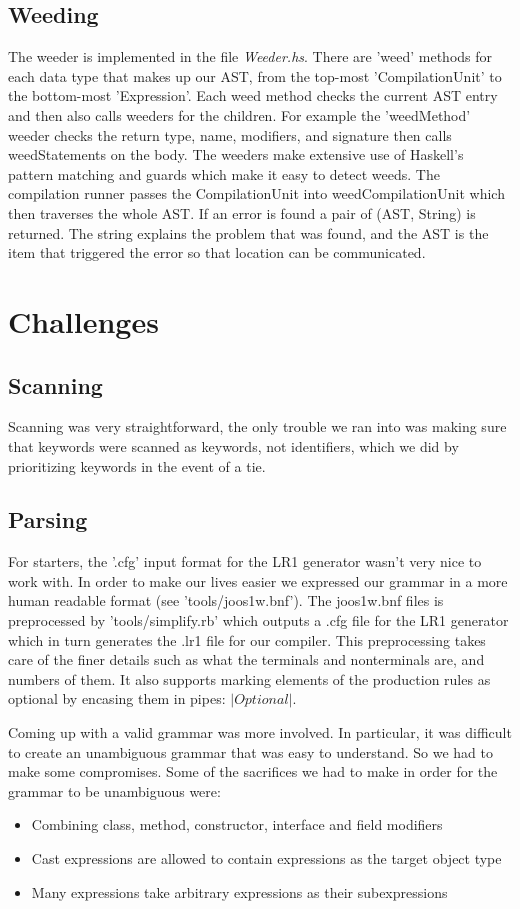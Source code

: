 \documentclass[12pt,letterpaper]{article}
\begin{document}
\subsection{Weeding}
The weeder is implemented in the file \emph{Weeder.hs}.
There are 'weed' methods for each data type that makes up our AST, from the top-most 'CompilationUnit' to the bottom-most 'Expression'.
Each weed method checks the current AST entry and then also calls weeders for the children.
For example the 'weedMethod' weeder checks the return type, name, modifiers, and signature then calls weedStatements on the body.
The weeders make extensive use of Haskell's pattern matching and guards which make it easy to detect weeds.
The compilation runner passes the CompilationUnit into weedCompilationUnit which then traverses the whole AST.
If an error is found a pair of (AST, String) is returned.
The string explains the problem that was found, and the AST is the item that triggered the error so that location can be communicated.

\section{Challenges}
\subsection{Scanning}
Scanning was very straightforward, the only trouble we ran into was making sure that keywords were scanned as keywords, not identifiers, which we did by prioritizing keywords in the event of a tie.

\subsection{Parsing}
For starters, the '.cfg' input format for the LR1 generator wasn't very nice to work with. In order to make our lives easier we expressed our grammar in a more human readable format (see 'tools/joos1w.bnf'). The joos1w.bnf files is preprocessed by 'tools/simplify.rb' which outputs a .cfg file for the LR1 generator which in turn generates the .lr1 file for our compiler. This preprocessing takes care of the finer details such as what the terminals and nonterminals are, and numbers of them. It also supports marking elements of the production rules as optional by encasing them in pipes: \emph{$|Optional|$}.


Coming up with a valid grammar was more involved. In particular, it was difficult to create an unambiguous grammar that was easy to understand. So we had to make some compromises. Some of the sacrifices we had to make in order for the grammar to be unambiguous were:
\begin{itemize}
  \item Combining class, method, constructor, interface and field modifiers
  \item Cast expressions are allowed to contain expressions as the target object type
  \item Many expressions take arbitrary expressions as their subexpressions
\end{itemize}
\end{document}
